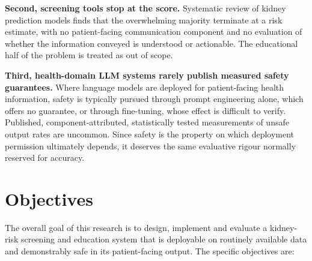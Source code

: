 \textbf{Second, screening tools stop at the score.} Systematic review of kidney
prediction models \cite{ramspek2021} finds that the overwhelming majority
terminate at a risk estimate, with no patient-facing communication component
and no evaluation of whether the information conveyed is understood or
actionable. The educational half of the problem is treated as out of scope.

\textbf{Third, health-domain LLM systems rarely publish measured safety
guarantees.} Where language models are deployed for patient-facing health
information, safety is typically pursued through prompt engineering alone,
which offers no guarantee, or through fine-tuning, whose effect is difficult to
verify. Published, component-attributed, statistically tested measurements of
unsafe output rates are uncommon. Since safety is the property on which
deployment permission ultimately depends, it deserves the same evaluative rigour
normally reserved for accuracy.

\section{Objectives}
\label{sec:objectives}

The overall goal of this research is to design, implement and evaluate a
kidney-risk screening and education system that is deployable on routinely
available data and demonstrably safe in its patient-facing output. The specific
objectives are:

